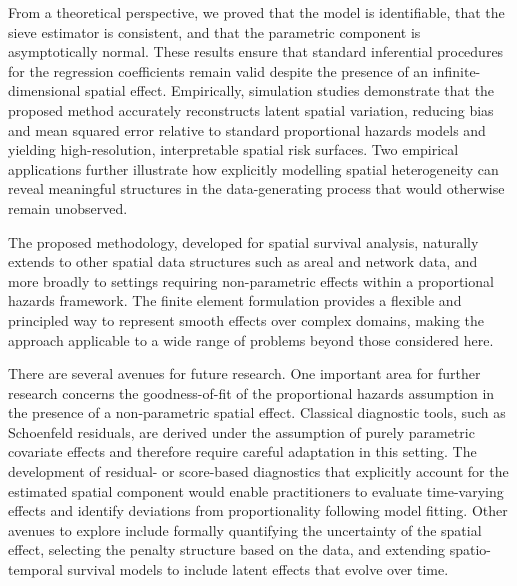 \documentclass[11pt]{article}
\begin{document}
From a theoretical perspective, we proved that the model is identifiable, that the sieve estimator is consistent, and that the parametric component is asymptotically normal. These results ensure that standard inferential procedures for the regression coefficients remain valid despite the presence of an infinite-dimensional spatial effect. Empirically, simulation studies demonstrate that the proposed method accurately reconstructs latent spatial variation, reducing bias and mean squared error relative to standard proportional hazards models and yielding high-resolution, interpretable spatial risk surfaces. Two empirical applications further illustrate how explicitly modelling spatial heterogeneity can reveal meaningful structures in the data-generating process that would otherwise remain unobserved.

The proposed methodology, developed for spatial survival analysis, naturally extends to other spatial data structures such as areal and network data, and more broadly to settings requiring non-parametric effects within a proportional hazards framework. The finite element formulation provides a flexible and principled way to represent smooth effects over complex domains, making the approach applicable to a wide range of problems beyond those considered here.

There are several avenues for future research. One important area for further research concerns the goodness-of-fit of the proportional hazards assumption in the presence of a non-parametric spatial effect. Classical diagnostic tools, such as Schoenfeld residuals, are derived under the assumption of purely parametric covariate effects and therefore require careful adaptation in this setting. The development of residual- or score-based diagnostics that explicitly account for the estimated spatial component would enable practitioners to evaluate time-varying effects and identify deviations from proportionality following model fitting. Other avenues to explore include formally quantifying the uncertainty of the spatial effect, selecting the penalty structure based on the data, and extending spatio-temporal survival models to include latent effects that evolve over time.





\end{document}
